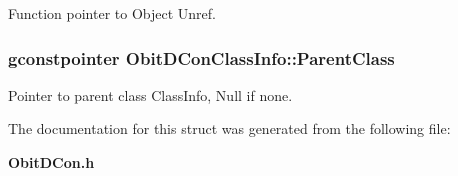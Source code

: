 Function pointer to Object Unref. 

\subsubsection{\setlength{\rightskip}{0pt plus 5cm}gconstpointer {\bf Obit\-DCon\-Class\-Info::Parent\-Class}}\label{structObitDConClassInfo_o3}


Pointer to parent class Class\-Info, Null if none. 



The documentation for this struct was generated from the following file:\begin{CompactItemize}
\item 
{\bf Obit\-DCon.h}\end{CompactItemize}
